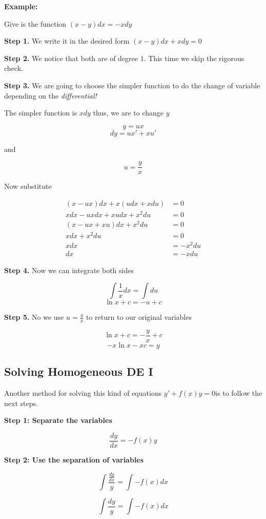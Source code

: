 \textbf{Example:}

Give is the function \((x -y)dx = - xdy\)

\textbf{Step 1.} We write it in the desired form \((x - y)dx + xdy = 0\)

\textbf{Step 2.} We notice that both are of degree \(1\). This time we skip the rigorous check.

\textbf{Step 3.} We are going to choose the simpler function to do the change of variable 
depending on the \emph{differential!} 

The simpler function is \(xdy\) thus, we are to change \(y\)

\[
    y = ux
\]
\[
    dy = ux' + xu'
\]

and 

\[
    u = \frac{y}{x}
\]

Now substitute

\begin{align*}
    (x - ux)dx + x(udx + xdu) &= 0\\
    xdx - u x dx + x u dx + x^{2}du &= 0\\
    (x - ux + xu)dx + x^{2}du &= 0\\
    xdx + x^{2}du &= 0\\
    xdx &= - x^{2}du\\
    dx &= - xdu
\end{align*}

\textbf{Step 4.} Now we can integrate both sides

\[
    \int \frac{1}{x}dx = \int du
\]
\[
    \ln x + c = -u + c
\]

\textbf{Step 5.} No we use \(u = \frac{y}{x}\) to return to our original variables

\[
    \ln x + c = -\frac{y}{x} + c
\]
\[
    -x\ln x - xc = y
\]

\subsection{Solving Homogeneous DE I}

Another method for solving this kind of equations \(y' + f(x)y = 0\)is to follow the next steps.

\textbf{Step 1: Separate the variables}

\[
    \frac{dy}{dx} = -f(x)y
\]

\textbf{Step 2: Use the separation of variables}

\[
    \int \frac{\frac{dy}{dx}}{y} = \int -f(x) dx
\]

\[
    \int \frac{dy}{y} = \int -f(x) dx
\]

